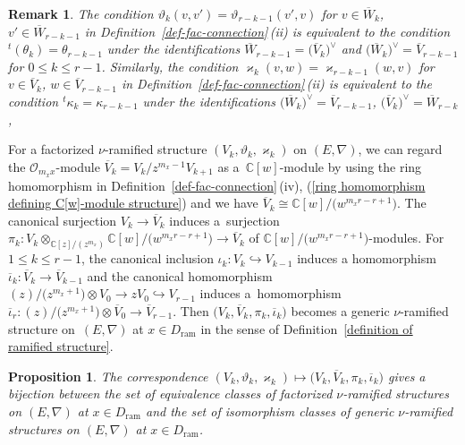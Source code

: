 \documentclass[pdftex]{sigma}
\numberwithin{equation}{section}
\newtheorem{Proposition}[Theorem]{Proposition}
\newtheorem{Remark}[Theorem]{Remark}
\begin{document}
\begin{Remark}\rm
The condition $\vartheta_k(v,v')=\vartheta_{r-k-1}(v',v)$ for $v\in\overline{W}_k$,
$v'\in \overline{W}_{r-k-1}$
in Definition~\ref{def-fac-connection}\,(ii)
is equivalent to the condition
$^t(\theta_k)=\theta_{r-k-1}$
under the identifications
$\overline{W}_{r-k-1} = \big(\overline{V}_k\big)^{\vee}$
and
$\big(\overline{W}_k\big)^{\vee} = \overline{V}_{r-k-1}$
for $0\leq k\leq r-1$.
Similarly, the condition $\varkappa_k(v,w)=\varkappa_{r-k-1}(w,v)$ for $v\in\overline{V}_k$,
$w\in \overline{V}_{r-k-1}$
in Definition~\ref{def-fac-connection}\,(ii)
is equivalent to the condition
$^t\kappa_k=\kappa_{r-k-1}$
under the identifications
$\big(\overline{W}_k\big)^{\vee}=\overline{V}_{r-k-1}$,
$\big(\overline{V}_k\big)^{\vee}=\overline{W}_{r-k}$,
\end{Remark}

For a factorized $\nu$-ramified structure
$(V_k,\vartheta_k,\varkappa_k)$ on $(E,\nabla)$,
we can regard the ${\mathcal O}_{m_xx}$-module
$\overline{V}_k=V_k/z^{m_x-1}V_{k+1}$
as a~$\mathbb{C}[w]$-module by using the ring homomorphism in Definition~\ref{def-fac-connection}\,(iv),
(\ref{ring homomorphism defining C[w]-module structure})
and we have $\overline{V}_k\cong\mathbb{C}[w]/\big(w^{m_xr-r+1}\big)$.
The canonical surjection $V_k\longrightarrow\overline{V}_k$
induces a~surjection
$
 \pi_k\colon V_k\otimes_{\mathbb{C}[z]/(z^{m_x})}\mathbb{C}[w]/\big(w^{m_xr-r+1}\big)
 \longrightarrow \overline{V}_k
$
of $\mathbb{C}[w]/\big(w^{m_xr-r+1}\big)$-modules.
For $1\leq k\leq r-1$,
the canonical inclusion $\iota_k\colon V_k\hookrightarrow V_{k-1}$
induces a homomorphism
$\overline{\iota}_{k}\colon\overline{V}_k\longrightarrow\overline{V}_{k-1}$
and the canonical homomorphism
$(z)/\big(z^{m_x+1}\big)\otimes V_{0}\rightarrow
z V_0\hookrightarrow V_{r-1}$
induces a~homomorphism
$\overline{\iota}_r\colon
(z)/\big(z^{m_x+1}\big)\otimes\overline{V}_0\longrightarrow \overline{V}_{r-1}$.
Then $\big(V_k,\overline{V}_k,\pi_k,\overline{\iota}_k\big)$
becomes a generic $\nu$-ramified structure on~$(E,\nabla)$ at $x\in D_{\mathrm{ram}}$
in the sense of Definition~\ref{definition of ramified structure}.


\begin{Proposition} \label{prop:correspondence-factorized}
The correspondence
$(V_k,\vartheta_k,\varkappa_k)\mapsto
\big(V_k,\overline{V}_k,\pi_k,\overline{\iota}_k\big)$
gives a bijection between
the set of equivalence classes of factorized $\nu$-ramified structures
on $(E,\nabla)$ at $x\in D_{\mathrm{ram}}$
and the set of isomorphism classes of
generic $\nu$-ramified structures on $(E,\nabla)$ at $x\in D_{\mathrm{ram}}$.
\end{Proposition}
\end{document}
